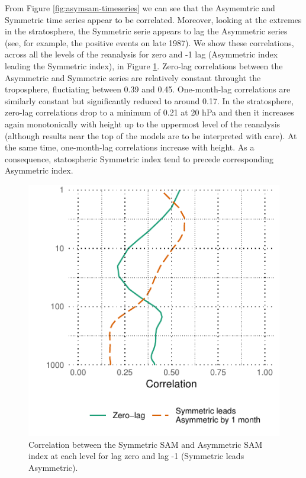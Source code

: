 \documentclass[]{ametsocV5}
\begin{document}
From Figure \ref{fig:asymsam-timeseries} we can see that the Asymemtric
and Symmetric time series appear to be correlated. Moreover, looking at
the extremes in the stratosphere, the Symmetric serie appears to lag the
Asymmetric series (see, for example, the positive events on late 1987).
We show these correlations, across all the levels of the reanalysis for
zero and -1 lag (Asymmetric index leading the Symmetric index), in
Figure \ref{fig:cor-lev}. Zero-lag correlations between the Asymmetric
and Symmetric series are relatively constant throught the troposphere,
fluctiating between 0.39 and 0.45. One-month-lag correlations are
similarly constant but significantly reduced to around 0.17. In the
stratosphere, zero-lag correlations drop to a minimum of 0.21 at 20 hPa
and then it increases again monotonically with height up to the
uppermost level of the reanalysis (although results near the top of the
models are to be interpreted with care). At the same time, one-month-lag
correlations increase with height. As a consequence, statospheric
Symmetric index tend to precede corresponding Asymmetric index.

\begin{figure}
\includegraphics{cor-lev-1} \caption[Correlation between the Symmetric SAM and Asymmetric SAM index at each level for lag zero and lag -1 (Symmetric leads Asymmetric)]{Correlation between the Symmetric SAM and Asymmetric SAM index at each level for lag zero and lag -1 (Symmetric leads Asymmetric).}\label{fig:cor-lev}
\end{figure}
\end{document}
